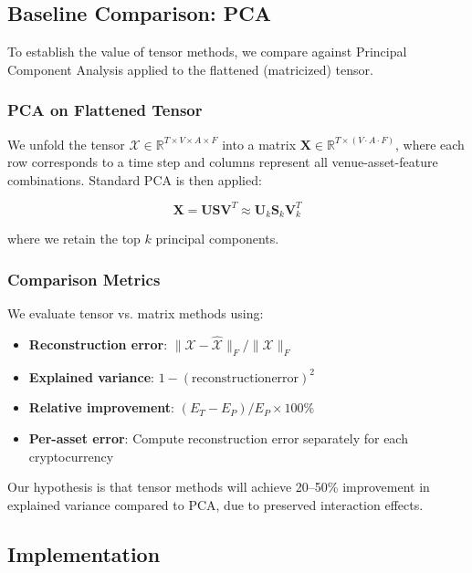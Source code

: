 \documentclass{article}
\begin{document}
\subsection{Baseline Comparison: PCA}

To establish the value of tensor methods, we compare against Principal Component Analysis applied to the flattened (matricized) tensor.

\subsubsection{PCA on Flattened Tensor}

We unfold the tensor $\mathcal{X} \in \mathbb{R}^{T \times V \times A \times F}$ into a matrix $\mathbf{X} \in \mathbb{R}^{T \times (V \cdot A \cdot F)}$, where each row corresponds to a time step and columns represent all venue-asset-feature combinations. Standard PCA is then applied:

$$\mathbf{X} = \mathbf{U} \mathbf{S} \mathbf{V}^T \approx \mathbf{U}_k \mathbf{S}_k \mathbf{V}_k^T$$

where we retain the top $k$ principal components.

\subsubsection{Comparison Metrics}

We evaluate tensor vs. matrix methods using:

\begin{itemize}[leftmargin=*]
    \item \textbf{Reconstruction error}: $\|\mathcal{X} - \hat{\mathcal{X}}\|_F / \|\mathcal{X}\|_F$
    \item \textbf{Explained variance}: $1 - (\mathrm{reconstruction error})^2$
    \item \textbf{Relative improvement}: $(E_{T} - E_{P}) / E_{P} \times 100\%$
    \item \textbf{Per-asset error}: Compute reconstruction error separately for each cryptocurrency
\end{itemize}

Our hypothesis is that tensor methods will achieve 20--50\% improvement in explained variance compared to PCA, due to preserved interaction effects.

\subsection{Implementation}
\end{document}
